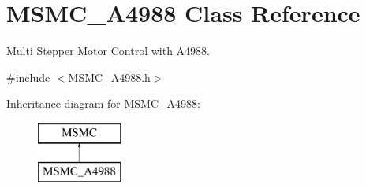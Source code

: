 \hypertarget{class_m_s_m_c___a4988}{\section{M\+S\+M\+C\+\_\+\+A4988 Class Reference}
\label{class_m_s_m_c___a4988}
}


Multi Stepper Motor Control with A4988.  




{\ttfamily \#include $<$M\+S\+M\+C\+\_\+\+A4988.\+h$>$}

Inheritance diagram for M\+S\+M\+C\+\_\+\+A4988\+:\begin{figure}[H]
\begin{center}
\leavevmode
\includegraphics[height=2.000000cm]{class_m_s_m_c___a4988}
\end{center}
\end{figure}
